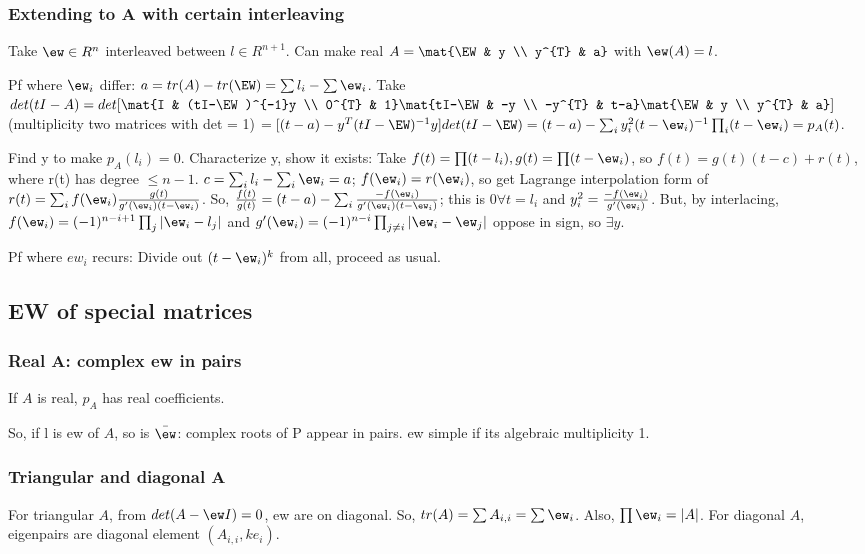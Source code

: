 \documentclass[oneside, article]{memoir}
\begin{document}
\subsubsection{Extending  to A with certain interleaving }
Take $\ew \in R^{n}$ interleaved between $l \in R^{n+1}$. Can make real $A = \mat{\EW & y \\ y^{T} & a}$ with $\ew(A) = l$.

Pf where $\ew_{i}$ differ: $a = tr(A) - tr(\EW) = \sum l_{i} - \sum \ew_{i}$. Take $det(tI-A) = det[\mat{I & (tI-\EW)^{-1}y \\ 0^{T} & 1}\mat{tI-\EW & -y \\ -y^{T} & t-a}\mat{\EW & y \\ y^{T} & a}]$ (multiplicity two matrices with det = 1) $= [(t-a) - y^{T}(tI-\EW)^{-1}y]det(tI-\EW) = (t-a) - \sum_{i}y_{i}^{2}(t-\ew_{i})^{-1}\prod_{i}(t-\ew_{i}) = p_{A}(t)$.

Find y to make $p_A(l_{i}) = 0$. Characterize y, show it exists: Take $f(t) = \prod (t- l_{i}), g(t) = \prod (t - \ew_{i})$, so $f(t) = g(t)(t-c)+r(t)$, where r(t) has degree $\leq n-1$. $c = \sum_{i}l_{i} - \sum_{i}\ew_{i} = a$; $f(\ew_{i}) = r(\ew_{i})$, so get Lagrange interpolation form of $r(t) = \sum_{i} f(\ew_{i})\frac{g(t)}{g'(\ew_{i})(t-\ew_{i})}$. So, $\frac{f(t)}{g(t)} = (t-a) - \sum_{i} \frac{-f(\ew_{i})}{g'(\ew_{i})(t-\ew_{i})}$; this is $0 \forall t = l_{i}$ and $y_{i}^{2} = \frac{-f(\ew_{i})}{g'(\ew_{i})}$. But, by interlacing, $f(\ew_{i}) = (-1)^{n-i+1}\prod_{j}|\ew_{i} - l_{j}|$ and $g'(\ew_{i}) = (-1)^{n-i}\prod_{j \neq i}|\ew_{i} - \ew_{j}|$ oppose in sign, so $\exists y$.

Pf where $ew_{i}$ recurs: Divide out $(t-\ew_{i})^{k}$ from all, proceed as usual.


\subsection{EW of special matrices}
\subsubsection{Real A: complex ew in pairs}
If $A$ is real, $p_{A}$ has real coefficients.

So, if l is ew of $A$, so is $\bar{\ew}$: complex roots of P appear in pairs. ew simple if its algebraic multiplicity 1.


\subsubsection{Triangular and diagonal A}
For triangular $A$, from $det(A-\ew I)=0$, ew are on diagonal. So, $tr(A) = \sum A_{i,i} = \sum \ew_{i}$. Also, $\prod \ew_{i} = |A|$. For diagonal $A$, eigenpairs are diagonal element $(A_{i,i}, ke_{i})$.
\end{document}
